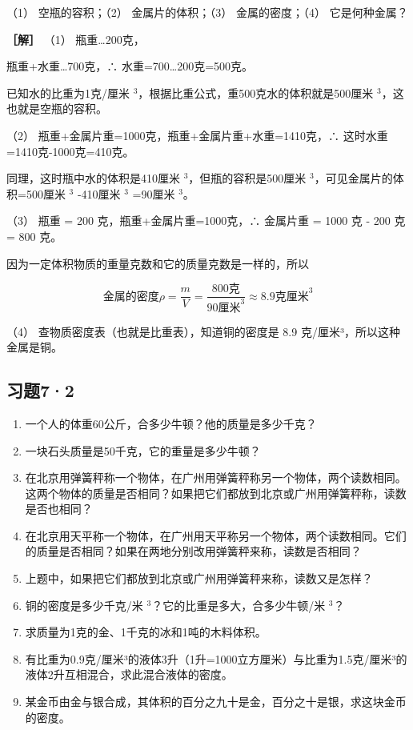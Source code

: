 （1） 空瓶的容积；（2） 金属片的体积；（3） 金属的密度；（4）
它是何种金属？

\textbf{［解］} （1） 瓶重\ldots200克，

瓶重+水重\ldots700克，∴ 水重=700\ldots200克=500克。

已知水的比重为1克/厘米
\(^{3}\)，根据比重公式，重500克水的体积就是500厘米
\(^{3}\)，这也就是空瓶的容积。

（2） 瓶重+金属片重=1000克，瓶重+金属片重+水重=1410克，∴
这时水重=1410克-1000克=410克。

同理，这时瓶中水的体积是410厘米 \(^{3}\)，但瓶的容积是500厘米
\(^{3}\)，可见金属片的体积=500厘米 \(^{3}\) -410厘米 \(^{3}\) =90厘米
\(^{3}\)。

（3） 瓶重 = 200 克，瓶重+金属片重=1000克，∴ 金属片重 = 1000 克 - 200 克
= 800 克。

因为一定体积物质的重量克数和它的质量克数是一样的，所以

\[
\text{金属的密度} \rho = \frac {m}{V} = \frac {800 \text{克}}{90 \text{厘米} ^ {3}} \approx 8.9 \text{克厘米} ^ {3}
\]

（4） 查物质密度表（也就是比重表），知道铜的密度是 8.9
克/厘米³，所以这种金属是铜。

\subsection{习题7·2}\label{ux4e60ux989872}

\begin{enumerate}
\def\labelenumi{\arabic{enumi}.}
\item
  一个人的体重60公斤，合多少牛顿？他的质量是多少千克？
\item
  一块石头质量是50千克，它的重量是多少牛顿？
\item
  在北京用弹簧秤称一个物体，在广州用弹簧秤称另一个物体，两个读数相同。这两个物体的质量是否相同？如果把它们都放到北京或广州用弹簧秤称，读数是否也相同？
\item
  在北京用天平称一个物体，在广州用天平称另一个物体，两个读数相同。它们的质量是否相同？如果在两地分别改用弹簧秤来称，读数是否相同？
\item
  上题中，如果把它们都放到北京或广州用弹簧秤来称，读数又是怎样？
\item
  铜的密度是多少千克/米 \(^{3}\)？它的比重是多大，合多少牛顿/米
  \(^{3}\)？
\item
  求质量为1克的金、1千克的冰和1吨的木料体积。
\item
  有比重为0.9克/厘米³的液体3升（1升=1000立方厘米）与比重为1.5克/厘米³的液体2升互相混合，求此混合液体的密度。
\item
  某金币由金与银合成，其体积的百分之九十是金，百分之十是银，求这块金币的密度。
\end{enumerate}

